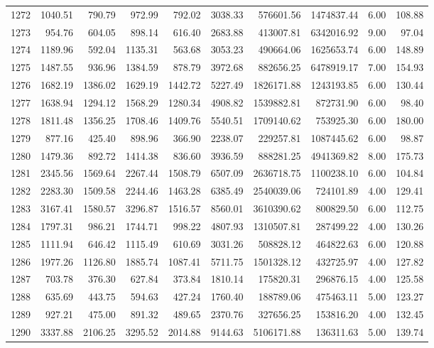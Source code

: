 \begin{tabular}{lrrrrrrrrr}
1272 & 1040.51 & 790.79 & 972.99 & 792.02 & 3038.33 & 576601.56 & 1474837.44 & 6.00 & 108.88 \\
1273 & 954.76 & 604.05 & 898.14 & 616.40 & 2683.88 & 413007.81 & 6342016.92 & 9.00 & 97.04 \\
1274 & 1189.96 & 592.04 & 1135.31 & 563.68 & 3053.23 & 490664.06 & 1625653.74 & 6.00 & 148.89 \\
1275 & 1487.55 & 936.96 & 1384.59 & 878.79 & 3972.68 & 882656.25 & 6478919.17 & 7.00 & 154.93 \\
1276 & 1682.19 & 1386.02 & 1629.19 & 1442.72 & 5227.49 & 1826171.88 & 1243193.85 & 6.00 & 130.44 \\
1277 & 1638.94 & 1294.12 & 1568.29 & 1280.34 & 4908.82 & 1539882.81 & 872731.90 & 6.00 & 98.40 \\
1278 & 1811.48 & 1356.25 & 1708.46 & 1409.76 & 5540.51 & 1709140.62 & 753925.30 & 6.00 & 180.00 \\
1279 & 877.16 & 425.40 & 898.96 & 366.90 & 2238.07 & 229257.81 & 1087445.62 & 6.00 & 98.87 \\
1280 & 1479.36 & 892.72 & 1414.38 & 836.60 & 3936.59 & 888281.25 & 4941369.82 & 8.00 & 175.73 \\
1281 & 2345.56 & 1569.64 & 2267.44 & 1508.79 & 6507.09 & 2636718.75 & 1100238.10 & 6.00 & 104.84 \\
1282 & 2283.30 & 1509.58 & 2244.46 & 1463.28 & 6385.49 & 2540039.06 & 724101.89 & 4.00 & 129.41 \\
1283 & 3167.41 & 1580.57 & 3296.87 & 1516.57 & 8560.01 & 3610390.62 & 800829.50 & 6.00 & 112.75 \\
1284 & 1797.31 & 986.21 & 1744.71 & 998.22 & 4807.93 & 1310507.81 & 287499.22 & 4.00 & 130.26 \\
1285 & 1111.94 & 646.42 & 1115.49 & 610.69 & 3031.26 & 508828.12 & 464822.63 & 6.00 & 120.88 \\
1286 & 1977.26 & 1126.80 & 1885.74 & 1087.41 & 5711.75 & 1501328.12 & 432725.97 & 4.00 & 127.82 \\
1287 & 703.78 & 376.30 & 627.84 & 373.84 & 1810.14 & 175820.31 & 296876.15 & 4.00 & 125.58 \\
1288 & 635.69 & 443.75 & 594.63 & 427.24 & 1760.40 & 188789.06 & 475463.11 & 5.00 & 123.27 \\
1289 & 927.21 & 475.00 & 891.32 & 489.65 & 2370.76 & 327656.25 & 153816.20 & 4.00 & 132.45 \\
1290 & 3337.88 & 2106.25 & 3295.52 & 2014.88 & 9144.63 & 5106171.88 & 136311.63 & 5.00 & 139.74 \\

\end{tabular}
